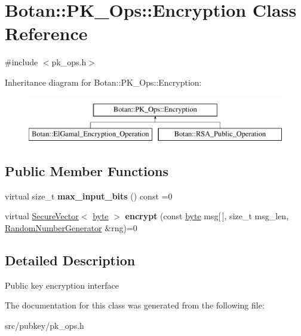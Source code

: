 \hypertarget{classBotan_1_1PK__Ops_1_1Encryption}{\section{Botan\-:\-:P\-K\-\_\-\-Ops\-:\-:Encryption Class Reference}
\label{classBotan_1_1PK__Ops_1_1Encryption}
}


{\ttfamily \#include $<$pk\-\_\-ops.\-h$>$}

Inheritance diagram for Botan\-:\-:P\-K\-\_\-\-Ops\-:\-:Encryption\-:\begin{figure}[H]
\begin{center}
\leavevmode
\includegraphics[height=2.000000cm]{classBotan_1_1PK__Ops_1_1Encryption}
\end{center}
\end{figure}
\subsection*{Public Member Functions}
\begin{DoxyCompactItemize}
\item 
\hypertarget{classBotan_1_1PK__Ops_1_1Encryption_a7c94231018c589ffa8c6a4a5f4b07ffd}{virtual size\-\_\-t {\bfseries max\-\_\-input\-\_\-bits} () const =0}\label{classBotan_1_1PK__Ops_1_1Encryption_a7c94231018c589ffa8c6a4a5f4b07ffd}

\item 
\hypertarget{classBotan_1_1PK__Ops_1_1Encryption_adcd610e1cc21563a93258875ec7eee0a}{virtual \hyperlink{classBotan_1_1SecureVector}{Secure\-Vector}$<$ \hyperlink{namespaceBotan_a7d793989d801281df48c6b19616b8b84}{byte} $>$ {\bfseries encrypt} (const \hyperlink{namespaceBotan_a7d793989d801281df48c6b19616b8b84}{byte} msg\mbox{[}$\,$\mbox{]}, size\-\_\-t msg\-\_\-len, \hyperlink{classBotan_1_1RandomNumberGenerator}{Random\-Number\-Generator} \&rng)=0}\label{classBotan_1_1PK__Ops_1_1Encryption_adcd610e1cc21563a93258875ec7eee0a}

\end{DoxyCompactItemize}


\subsection{Detailed Description}
Public key encryption interface 

The documentation for this class was generated from the following file\-:\begin{DoxyCompactItemize}
\item 
src/pubkey/pk\-\_\-ops.\-h\end{DoxyCompactItemize}
